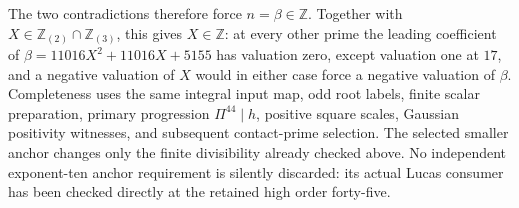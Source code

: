 The two contradictions therefore force $n=\beta\in\mathbb Z$.
Together with $X\in\mathbb Z_{(2)}\cap\mathbb Z_{(3)}$, this gives
$X\in\mathbb Z$: at every other prime the leading coefficient of
$\beta=11016X^2+11016X+5155$ has valuation zero, except valuation one
at $17$, and a negative valuation of $X$ would in either case force
a negative valuation of $\beta$.  Completeness uses the same integral
input map, odd root labels, finite scalar preparation, primary
progression $\Pi^{44}\mid h$, positive square scales, Gaussian
positivity witnesses, and subsequent contact-prime selection.  The
selected smaller anchor changes only the finite divisibility already
checked above.  No independent exponent-ten anchor requirement is
silently discarded: its actual Lucas consumer has been checked directly
at the retained high order forty-five.
